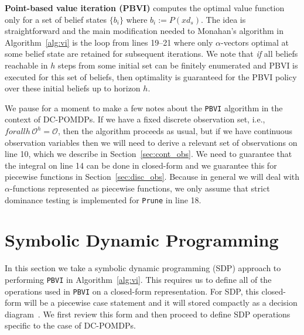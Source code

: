 \documentclass{article} %
\begin{document}
\textbf{Point-based value iteration (PBVI)} computes the optimal value function only for a set of belief states $\{ b_i \}$ where $b_i := P(xd_s)$.  The idea is straightforward and the main modification needed to Monahan's algorithm in Algorithm~\ref{alg:vi} is the loop from lines 19--21 where only $\alpha$-vectors optimal at some belief state are retained for subsequent iterations.  We note that \emph{if} all beliefs reachable in $h$ steps from some initial set can be finitely enumerated and PBVI is executed for this set of beliefs, then optimality is guaranteed for the PBVI policy over these initial beliefs up to horizon $h$.  

We pause for a moment to make a few notes about the \texttt{PBVI}
algorithm in the context of DC-POMDPs.  If we have a fixed discrete
observation set, i.e., $forall h \, \mathcal{O}^h = \mathcal{O}$, then
the algorithm proceeds as usual, but if we have continuous observation
variables then we will need to derive a relevant set of observations
on line 10, which we describe in Section~\ref{sec:cont_obs}.  We need
to guarantee that the integral on line 14 can be done in closed-form
and we guarantee this for piecewise functions in
Section~\ref{sec:disc_obs}.  Because in general we will deal with
$\alpha$-functions represented as piecewise functions, we only assume
that strict dominance testing is implemented for \texttt{Prune} in
line 18.


\section{Symbolic Dynamic Programming} 

In this section we take a symbolic dynamic programming (SDP) approach
to performing \texttt{PBVI} in Algorithm~\ref{alg:vi}.  This requires
us to define all of the operations used in \texttt{PBVI} on a
closed-form representation.  For SDP, this closed-form will be a
piecewise case statement and it will stored compactly as a decision
diagram~\cite{sanner_uai11}.  We first review this form and then
proceed to define SDP operations specific to the case of DC-POMDPs.
\end{document}
